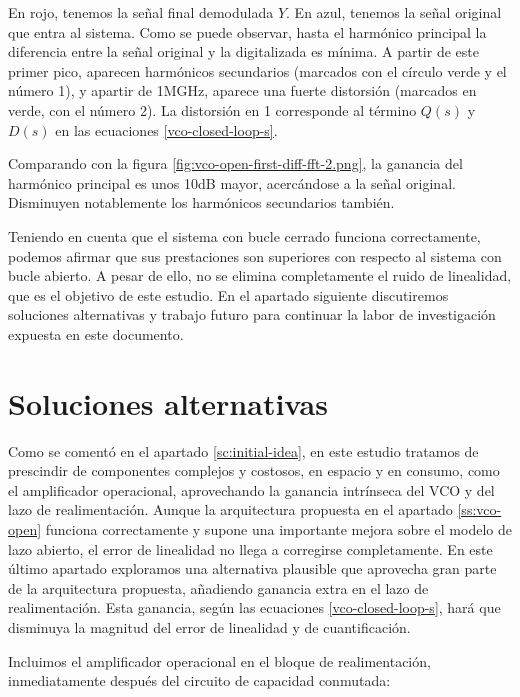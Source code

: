 \documentclass[12pt]{report} %
\begin{document}
	En rojo, tenemos la señal final demodulada $Y$. En azul, tenemos la señal original que entra al sistema. Como se puede observar, hasta el harmónico principal la diferencia entre la señal original y la digitalizada es mínima. A partir de este primer pico, aparecen harmónicos secundarios (marcados con el círculo verde y el número 1), y apartir de 1MGHz, aparece una fuerte distorsión (marcados en verde, con el número 2). La distorsión en 1 corresponde al término $Q(s)$ y $D(s)$ en las ecuaciones \ref{vco-closed-loop-s}.
	
	Comparando con la figura \ref{fig:vco-open-first-diff-fft-2.png}, la ganancia del harmónico principal es unos 10dB mayor, acercándose a la señal original. Disminuyen notablemente los harmónicos secundarios también.
	
	Teniendo en cuenta que el sistema con bucle cerrado funciona correctamente, podemos afirmar que sus prestaciones son superiores con respecto al sistema con bucle abierto. A pesar de ello, no se elimina completamente el ruido de linealidad, que es el objetivo de este estudio. En el apartado siguiente discutiremos soluciones alternativas y trabajo futuro para continuar la labor de investigación expuesta en este documento.
	
	\section{Soluciones alternativas}
	
	Como se comentó en el apartado \ref{sc:initial-idea}, en este estudio tratamos de prescindir de componentes complejos y costosos, en espacio y en consumo, como el amplificador operacional, aprovechando la ganancia intrínseca del VCO y del lazo de realimentación. Aunque la arquitectura propuesta en el apartado \ref{ss:vco-open} funciona correctamente y supone una importante mejora sobre el modelo de lazo abierto, el error de linealidad no llega a corregirse completamente. En este último apartado exploramos una alternativa plausible que aprovecha gran parte de la arquitectura propuesta, añadiendo ganancia extra en el lazo de realimentación. Esta ganancia, según las ecuaciones \ref{vco-closed-loop-s}, hará que disminuya la magnitud del error de linealidad y de cuantificación.
	
	Incluimos el amplificador operacional en el bloque de realimentación, inmediatamente después del circuito de capacidad conmutada:
	
\end{document}
